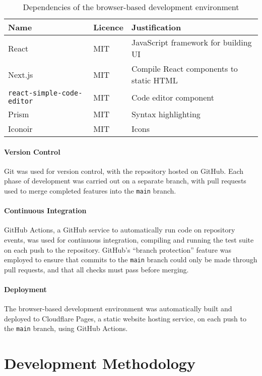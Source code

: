 \begin{table}[H]
\centering
\begin{tabular}{lll}
\hline
\textbf{Name} & \textbf{Licence} & \textbf{Justification} \\
\hline
React & MIT & JavaScript framework for building UI \\
Next.js & MIT & Compile React components to static HTML \\
\texttt{react-simple-code-editor} & MIT & Code editor component \\
Prism & MIT & Syntax highlighting \\
Iconoir & MIT & Icons \\
\hline
\end{tabular}
\caption{Dependencies of the browser-based development environment}
\label{tab:web-dependencies}
\end{table}

\paragraph{Version Control}

Git was used for version control, with the repository hosted on GitHub. Each phase of development was carried out on a separate branch, with pull requests used to merge completed features into the \texttt{main} branch.

\paragraph{Continuous Integration} GitHub Actions, a GitHub service to automatically run code on repository events, was used for continuous integration, compiling and running the test suite on each push to the repository. GitHub's ``branch protection'' feature was employed to ensure that commits to the \texttt{main} branch could only be made through pull requests, and that all checks must pass before merging.

\paragraph{Deployment} The browser-based development environment was automatically built and deployed to Cloudflare Pages, a static website hosting service, on each push to the \texttt{main} branch, using GitHub Actions.

\section{Development Methodology}

